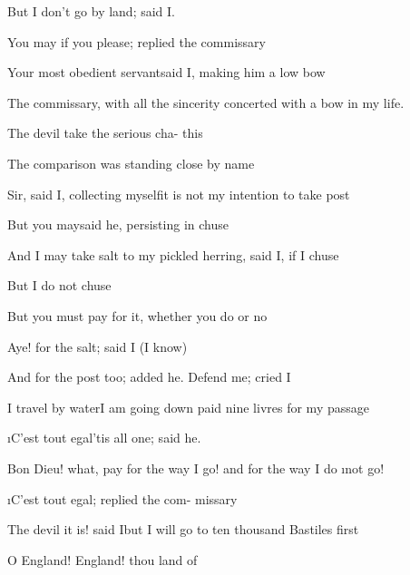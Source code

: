 \documentclass[twoside]{article}
\begin{document}
\tsh But I don’t go by land; said I.

\tsh You may if you please; replied\break
the commissary\tsh

Your most obedient servant\tsh said I,\break
making him a low bow\tsh

The commissary, with all the sincerity\break
{}
concerted with a bow in my life.

\tsh The devil take the serious cha-\break
{}
this\tsh

The comparison was standing close by\break
{}
name\tsk

Sir, said I, collecting myself\tsk it is not\break
my intention to take post\tsh

\tsk But you may\tsk said he, persisting in\break
{}
chuse\tsh

\tsk And I may take salt to my pickled\break
herring, said I, if I chuse\tsh

\tsk But I do not chuse\tsk

\tsk But you must pay for it, whether\break
you do or no\tsh\etp

Aye! for the salt; said I (I know)\tsh\break
{}
\parskip 7pt

\tsk And for the post too; added he.\break
Defend me; cried I\tsh\etp

I travel by water\tsk I am going down\break
{}
paid nine livres for my passage\tsh

\i{C’est tout egal}\tsk ’tis all one; said he.

Bon Dieu! what, pay for the way I\break
go! and for the way I do \i{not} go!

\tsh \i{C’est tout egal}; replied the com-\break
missary\tsh

\tsh The devil it is! said I\tsk but I will\break
go to ten thousand Bastiles first\tsh

O England! England! thou land of\break
{}
\end{document}

